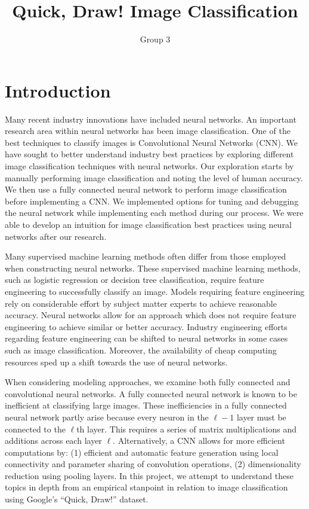 \documentclass[11pt]{article}
\title{Quick, Draw! Image Classification}
\author{Group 3}
\begin{document}
\maketitle

\section{Introduction}

Many recent industry innovations have included neural networks. An
important research area within neural networks has been image classification.
One of the best techniques to classify images is Convolutional Neural
Networks (CNN). We have sought to better understand industry best practices
by exploring different image classification techniques with neural networks.
Our exploration starts by manually performing image classification and
noting the level of human accuracy. We then use a fully connected neural
network to perform image classification before implementing a CNN. We
implemented options for tuning and debugging the neural network while
implementing each method during our process. We were able to develop an
intuition for image classification best practices using neural networks
after our research.

Many supervised machine learning methods often differ from those employed 
when constructing neural networks. These supervised machine learning
methods, such as logistic regression or decision tree classification,
require feature engineering to successfully classify an image. Models
requiring feature engineering rely on considerable effort by subject matter
experts to achieve reasonable accuracy. Neural networks allow for an
approach which does not require feature engineering to achieve similar or
better accuracy. Industry engineering efforts regarding feature engineering
can be shifted to neural networks  in some cases such as image
classification. Moreover, the availability of cheap computing resources
sped up a shift towards the use of neural networks.

When considering modeling approaches, we examine both fully connected and 
convolutional neural networks. A fully connected neural network is known to 
be inefficient at classifying large images. These inefficiencies in a fully 
connected neural network partly arise because every neuron in the $\ell-1$
layer must be connected to the $\ell$th layer. This requires a series
of matrix multiplications and additions across each layer $\ell$.
Alternatively, a CNN allows for more efficient computations by: (1) efficient
and automatic feature generation using local connectivity and parameter
sharing of convolution operations, (2) dimensionality reduction using pooling
layers. In this project, we attempt to understand these topics in depth
from an empirical stanpoint in relation to image classification using
Google's ``Quick, Draw!'' dataset.
\end{document}
